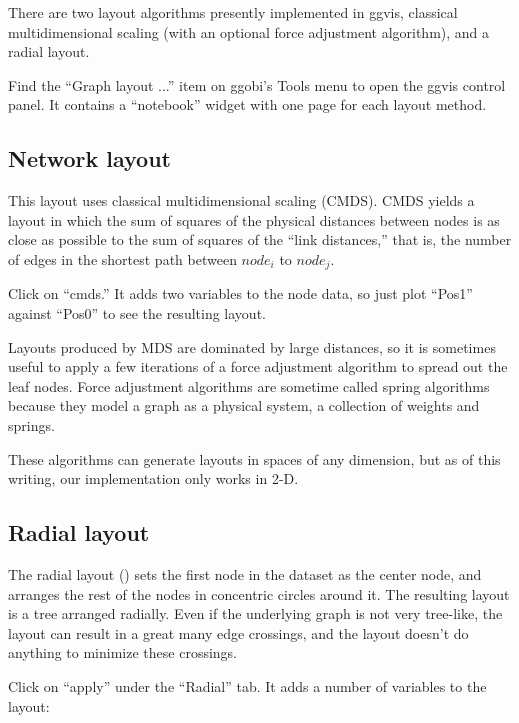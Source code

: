 \documentclass[11pt]{article}
\begin{document}
There are two layout algorithms presently implemented in ggvis,
classical multidimensional scaling (with an optional force
adjustment algorithm), and a radial layout.

Find the ``Graph layout ...'' item on ggobi's Tools menu
to open the ggvis control panel.  It contains a ``notebook''
widget with one page for each layout method.

\subsection {Network layout}

This layout uses classical multidimensional scaling (CMDS).  CMDS yields a
layout in which the sum of squares of the physical distances between nodes
is as close as possible to the sum of squares of the ``link distances,''
that is, the number of edges in the shortest path between $node_i$
to $node_j$.

Click on ``cmds.''  It adds two variables to the node data, so 
just plot ``Pos1'' against ``Pos0'' to see the resulting layout.

Layouts produced by MDS are dominated by large distances, so it
is sometimes useful to apply a few iterations of a force adjustment
algorithm to spread out the leaf nodes.  Force adjustment algorithms
are sometime called spring algorithms because they model a graph as
a physical system, a collection of weights and springs.

These algorithms can generate layouts in spaces of any dimension,
but as of this writing, our implementation only works in 2-D.

\subsection {Radial layout}

The radial layout (\cite{Wills99}) sets the first node in the dataset
as the center node, and arranges the rest of the nodes in concentric
circles around it.  The resulting layout is a tree arranged radially.
Even if the underlying graph is not very tree-like, the layout can result
in a great many edge crossings, and the layout doesn't do anything to
minimize these crossings.

Click on ``apply'' under the ``Radial'' tab.  It adds a number of
variables to the layout:
\end{document}
